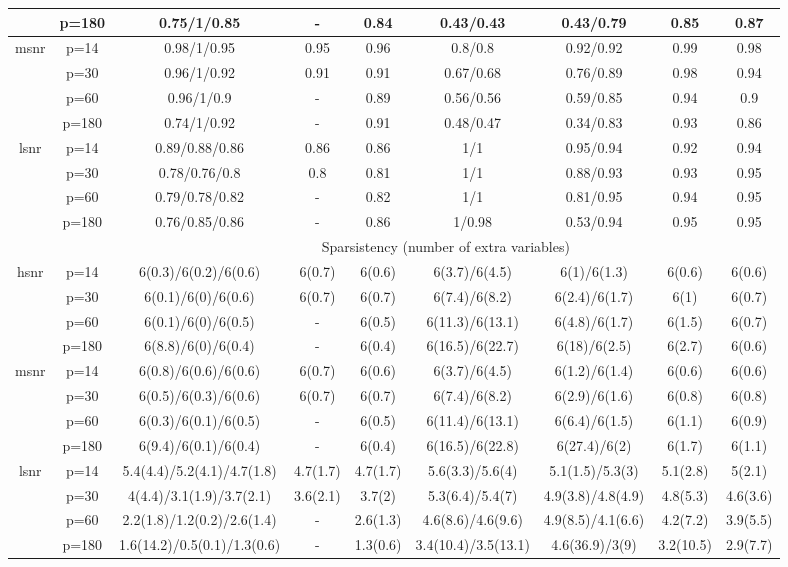 \begin{table}[ht]
{\begin{tabular}{|c|c|ccccccc|}
   & p=180 & 0.75/1/0.85 & - & 0.84 & 0.43/0.43 & 0.43/0.79 & 0.85 & 0.87 \\ 
  \midrule\multirow{4}[2]{*}{msnr} & p=14 & 0.98/1/0.95 & 0.95 & 0.96 & 0.8/0.8 & 0.92/0.92 & 0.99 & 0.98 \\ 
   & p=30 & 0.96/1/0.92 & 0.91 & 0.91 & 0.67/0.68 & 0.76/0.89 & 0.98 & 0.94 \\ 
   & p=60 & 0.96/1/0.9 & - & 0.89 & 0.56/0.56 & 0.59/0.85 & 0.94 & 0.9 \\ 
   & p=180 & 0.74/1/0.92 & - & 0.91 & 0.48/0.47 & 0.34/0.83 & 0.93 & 0.86 \\ 
  \midrule\multirow{4}[2]{*}{lsnr} & p=14 & 0.89/0.88/0.86 & 0.86 & 0.86 & 1/1 & 0.95/0.94 & 0.92 & 0.94 \\ 
   & p=30 & 0.78/0.76/0.8 & 0.8 & 0.81 & 1/1 & 0.88/0.93 & 0.93 & 0.95 \\ 
   & p=60 & 0.79/0.78/0.82 & - & 0.82 & 1/1 & 0.81/0.95 & 0.94 & 0.95 \\ 
   & p=180 & 0.76/0.85/0.86 & - & 0.86 & 1/0.98 & 0.53/0.94 & 0.95 & 0.95 \\ 
   \midrule 
 \multicolumn{1}{|c}{} &       & \multicolumn{7}{c|}{Sparsistency (number of extra variables)} \\
\midrule\multirow{4}[2]{*}{hsnr} & p=14 & 6(0.3)/6(0.2)/6(0.6) & 6(0.7) & 6(0.6) & 6(3.7)/6(4.5) & 6(1)/6(1.3) & 6(0.6) & 6(0.6) \\ 
   & p=30 & 6(0.1)/6(0)/6(0.6) & 6(0.7) & 6(0.7) & 6(7.4)/6(8.2) & 6(2.4)/6(1.7) & 6(1) & 6(0.7) \\ 
   & p=60 & 6(0.1)/6(0)/6(0.5) & - & 6(0.5) & 6(11.3)/6(13.1) & 6(4.8)/6(1.7) & 6(1.5) & 6(0.7) \\ 
   & p=180 & 6(8.8)/6(0)/6(0.4) & - & 6(0.4) & 6(16.5)/6(22.7) & 6(18)/6(2.5) & 6(2.7) & 6(0.6) \\ 
  \midrule\multirow{4}[2]{*}{msnr} & p=14 & 6(0.8)/6(0.6)/6(0.6) & 6(0.7) & 6(0.6) & 6(3.7)/6(4.5) & 6(1.2)/6(1.4) & 6(0.6) & 6(0.6) \\ 
   & p=30 & 6(0.5)/6(0.3)/6(0.6) & 6(0.7) & 6(0.7) & 6(7.4)/6(8.2) & 6(2.9)/6(1.6) & 6(0.8) & 6(0.8) \\ 
   & p=60 & 6(0.3)/6(0.1)/6(0.5) & - & 6(0.5) & 6(11.4)/6(13.1) & 6(6.4)/6(1.5) & 6(1.1) & 6(0.9) \\ 
   & p=180 & 6(9.4)/6(0.1)/6(0.4) & - & 6(0.4) & 6(16.5)/6(22.8) & 6(27.4)/6(2) & 6(1.7) & 6(1.1) \\ 
  \midrule\multirow{4}[2]{*}{lsnr} & p=14 & 5.4(4.4)/5.2(4.1)/4.7(1.8) & 4.7(1.7) & 4.7(1.7) & 5.6(3.3)/5.6(4) & 5.1(1.5)/5.3(3) & 5.1(2.8) & 5(2.1) \\ 
   & p=30 & 4(4.4)/3.1(1.9)/3.7(2.1) & 3.6(2.1) & 3.7(2) & 5.3(6.4)/5.4(7) & 4.9(3.8)/4.8(4.9) & 4.8(5.3) & 4.6(3.6) \\ 
   & p=60 & 2.2(1.8)/1.2(0.2)/2.6(1.4) & - & 2.6(1.3) & 4.6(8.6)/4.6(9.6) & 4.9(8.5)/4.1(6.6) & 4.2(7.2) & 3.9(5.5) \\ 
   & p=180 & 1.6(14.2)/0.5(0.1)/1.3(0.6) & - & 1.3(0.6) & 3.4(10.4)/3.5(13.1) & 4.6(36.9)/3(9) & 3.2(10.5) & 2.9(7.7) \\ 
   \bottomrule 
\end{tabular}
}
\end{table}
